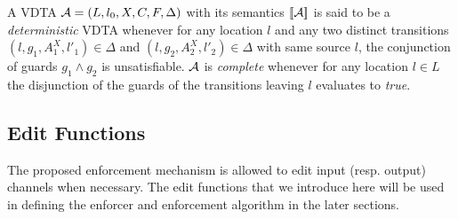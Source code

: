 \begin{definition}
	\label{def:detComplete}
	A VDTA ${\mathcal A}= \left(L, {l_0}, X, C, F,  \Delta \right)$ with its semantics $[\!\left[{\mathcal A}\right]\!]$ is said to be a {\em deterministic} \ac{VDTA} whenever for any location $l$
	and any two distinct transitions $\left(l,g_1,A^X_1,l'_1\right) \in \Delta$ and $\left(l, g_2, A^X_2, l'_2 \right)\in \Delta$ with same source $l$, the conjunction of guards $g_1\wedge g_2$ is unsatisfiable.
	${\mathcal A}$ is {\em complete} whenever for any location $l\in L$ the disjunction of the guards of the transitions leaving $l$ evaluates to {\em true}.
\end{definition}


\subsection{Edit Functions}
\label{sec:editfunc}
The proposed enforcement mechanism is allowed to edit input (resp. output) channels when necessary.
The edit functions that we introduce here will be used in defining the enforcer and  enforcement algorithm in the later sections. 

